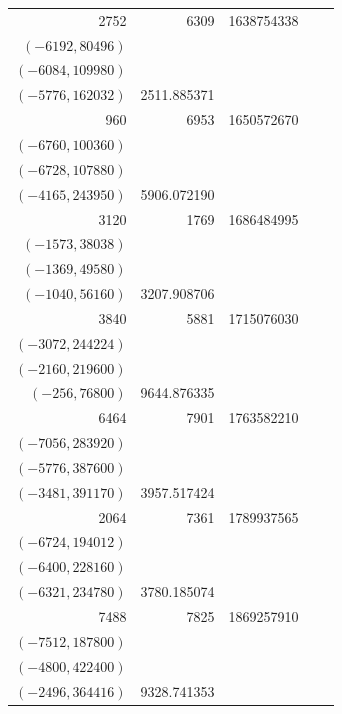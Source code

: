 \documentclass[11pt]{article}
\begin{document}
\begin{longtable}{r r r l r}
2752 & 6309 & 1638754338 & \begin{tabular}[t]{@{}l@{}}$(-6241,61778)$\\$(-6192,80496)$\\$(-6084,109980)$\\$(-5776,162032)$\end{tabular} & 2511.885371\\[5pt]
960 & 6953 & 1650572670 & \begin{tabular}[t]{@{}l@{}}$(-6912,47232)$\\$(-6760,100360)$\\$(-6728,107880)$\\$(-4165,243950)$\end{tabular} & 5906.072190\\[5pt]
3120 & 1769 & 1686484995 & \begin{tabular}[t]{@{}l@{}}$(-1740,15660)$\\$(-1573,38038)$\\$(-1369,49580)$\\$(-1040,56160)$\end{tabular} & 3207.908706\\[5pt]
3840 & 5881 & 1715076030 & \begin{tabular}[t]{@{}l@{}}$(-5880,7560)$\\$(-3072,244224)$\\$(-2160,219600)$\\$(-256,76800)$\end{tabular} & 9644.876335\\[5pt]
6464 & 7901 & 1763582210 & \begin{tabular}[t]{@{}l@{}}$(-7225,258570)$\\$(-7056,283920)$\\$(-5776,387600)$\\$(-3481,391170)$\end{tabular} & 3957.517424\\[5pt]
2064 & 7361 & 1789937565 & \begin{tabular}[t]{@{}l@{}}$(-7344,34272)$\\$(-6724,194012)$\\$(-6400,228160)$\\$(-6321,234780)$\end{tabular} & 3780.185074\\[5pt]
7488 & 7825 & 1869257910 & \begin{tabular}[t]{@{}l@{}}$(-7800,54600)$\\$(-7512,187800)$\\$(-4800,422400)$\\$(-2496,364416)$\end{tabular} & 9328.741353\\[5pt]

\end{longtable}
\end{document}
